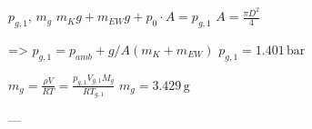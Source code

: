 \( p_{g,1} \), \( m_g \)  
\( m_K g + m_{EW} g + p_0 \cdot A = p_{g,1} \)  
\( A = \frac{\pi D^2}{4} \)  

=> \( p_{g,1} = p_{amb} + g / A (m_K + m_{EW}) \)  
\( p_{g,1} = 1.401 \, \text{bar} \)  

\( m_g = \frac{\rho V}{R T} = \frac{p_{g,1} V_{g,1} M_g}{R T_{g,1}} \)  
\( m_g = 3.429 \, \text{g} \)  

---